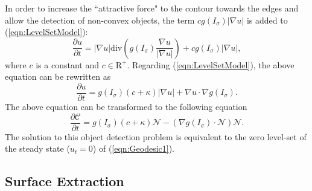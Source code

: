 In order to increase the ``attractive force" to the contour towards the edges and allow the detection of non-convex objects, the term $cg(I_{\sigma})|\nabla u|$ is added to (\ref{eqn:LevelSetModel}):
\begin{equation}
\label{eqn:Geodesic1}
\frac{\partial u}{\partial t} = |\nabla u| \textrm{div} \left(g(I_{\sigma}) \frac{\nabla u}{|\nabla u|}\right) + c g(I_{\sigma}) |\nabla u|,
\end{equation}
where $c$ is a constant and $c \in \mathrm{R}^+$.
Regarding (\ref{eqn:LevelSetModel}), the above equation can be rewritten as
\begin{equation}
\label{eqn:Geodesic2}
\frac{\partial u}{\partial t} = g( I_{\sigma} )( c + \kappa ) |\nabla u| + \nabla u \cdot \nabla g(I_{\sigma}).
\end{equation}
The above equation can be transformed to the following equation
\begin{equation}
\label{eqn:Geodesic3}
\frac{\partial \mathcal{C}}{\partial t} = g(I_{\sigma}) ( c + \kappa ) \mathcal{N} - ( \nabla g(I_{\sigma}) \cdot \mathcal{N} ) \mathcal{N}.
\end{equation}
The solution to this object detection problem is equivalent to the zero level-set of the steady state ($u_t = 0$) of (\ref{eqn:Geodesic1}).

\subsection{Surface Extraction}

